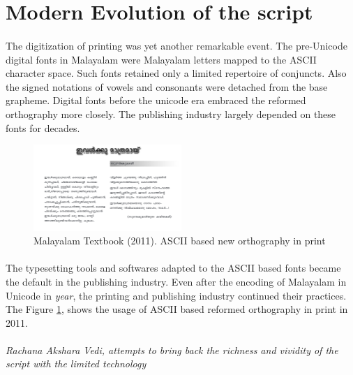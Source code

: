 \documentclass[10pt]{article}
\begin{document}
\section{Modern Evolution of the script}
\paragraph{}
The digitization of printing was yet another remarkable event. The pre-Unicode digital fonts in Malayalam were Malayalam letters mapped to the ASCII character space.  Such fonts retained only a limited repertoire of conjuncts. Also the signed notations of vowels and consonants were detached from the base grapheme. Digital fonts before the unicode era embraced the reformed orthography more closely. The publishing industry largely depended on these fonts for decades.

\begin{figure}
  \centering
   \includegraphics[width=0.5\textwidth]{images/2011-Malayalam-Textbook.png}
  \caption{Malayalam Textbook (2011). ASCII based new orthography in print}
\label{textbook2011}
\end{figure}

\paragraph{}
The typesetting tools and softwares adapted to the ASCII based fonts became the default in the publishing industry. Even after the encoding of Malayalam in Unicode in \textit{year}, the printing and publishing industry continued their practices. The Figure \ref{textbook2011}, shows the usage of ASCII based reformed orthography in print in 2011.

\paragraph{}

\textit{Rachana Akshara Vedi, attempts to bring back the richness and vividity of the script with the limited technology}
\end{document}
